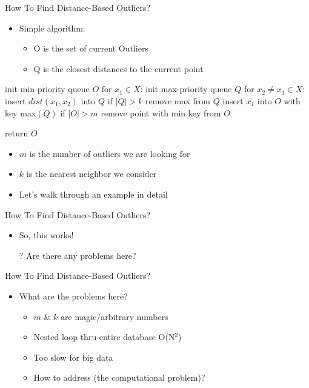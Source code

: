 \documentclass[aspectratio=169]{beamer}
\begin{document}
\begin{frame}[fragile]{How To Find Distance-Based Outliers?}


\begin{itemize}
\item Simple algorithm: 
        \begin{itemize}
	\item O is the set of current Outliers
	\item Q is the closest distances to the current point
        \end{itemize}
\end{itemize}
\vspace{-1em}
\begin{SQL}
init min-priority queue $O$
for $x_1 \in X$:
  init max-priority queue $Q$
  for $x_2 \neq x_1 \in X$:
    insert $dist(x_1, x_2)$ into $Q$
    if $|Q| > k$
      remove max from $Q$
  insert $x_1$ into $O$ with key max$(Q)$
  if $|O| > m$
    remove point with min key from $O$

return $O$ 
\end{SQL}

\begin{itemize}
\item $m$ is the number of outliers we are looking for
\item $k$ is the nearest neighbor we consider
\item Let's walk through an example in detail
\end{itemize}

\end{frame}
\begin{frame}[fragile]{How To Find Distance-Based Outliers?}
\begin{itemize}
\item So, this works!
\item[?] Are there any problems here?
\end{itemize}

\end{frame}
\begin{frame}{How To Find Distance-Based Outliers?}

\begin{itemize}
\item What are the problems here?
	\begin{itemize}
	\item $m$ \& $k$ are magic/arbitrary numbers
	\item Nested loop thru entire database O(N$^2$)
	\item Too slow for big data
	\item How to address (the computational problem)?
	\end{itemize}
\end{itemize}

\end{frame}
\end{document}
